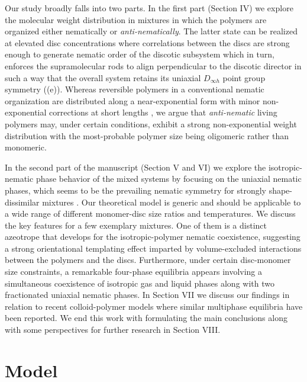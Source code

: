 Our study broadly falls into two parts. In the first part (Section IV) we explore the molecular weight  distribution in mixtures in which the polymers are organized either nematically or {\em anti-nematically}. The latter state can be realized at elevated disc concentrations where  correlations between the discs are strong enough to generate nematic order of the discotic subsystem which in turn, enforces the supramolecular rods to align perpendicular to the discotic director in such a way that the overall system retains its  uniaxial $D_{\infty  h}$ point group symmetry ((e)). Whereas reversible polymers in a conventional nematic organization are distributed along a near-exponential form with minor non-exponential corrections at short lengths \cite{kuriabova2010},  we argue that {\em anti-nematic} living polymers may, under certain conditions, exhibit a strong non-exponential weight distribution with the most-probable polymer size being oligomeric rather than monomeric. 

In the second part of the manuscript (Section V and VI) we explore the isotropic-nematic phase behavior of the mixed systems by focusing on the uniaxial nematic phases, which seems to be the prevailing nematic symmetry for strongly shape-dissimilar mixtures \cite{wensinkrodplate,campallenbolhuisfrenkel,varga2002,matsuda2003,jacksonbiax}. Our theoretical model is generic and should be applicable to a wide range of different monomer-disc size ratios and temperatures. We discuss the key features for a few exemplary mixtures. One of them is a distinct azeotrope that develops for the isotropic-polymer nematic coexistence, suggesting a strong orientational templating effect imparted by volume-excluded interactions between the polymers and the discs.  Furthermore,  under certain disc-monomer size constraints,  a remarkable four-phase equilibria appears involving a simultaneous coexistence of isotropic gas and liquid phases along with two fractionated uniaxial nematic phases. In Section VII we discuss our findings in relation to recent colloid-polymer models where similar multiphase equilibria have been reported. We end this work with formulating the main conclusions along with some perspectives for further research in Section VIII. 


\section{Model}


